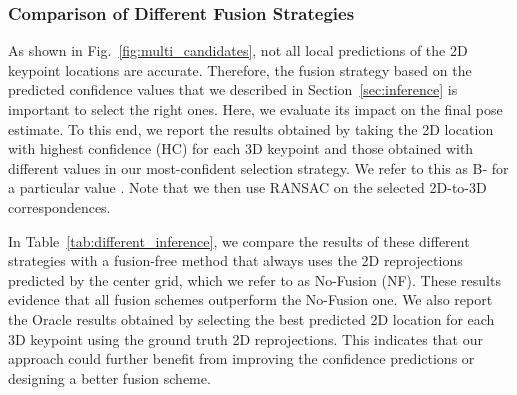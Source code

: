 \documentclass[10pt,twocolumn,letterpaper]{article}
\begin{document}
\subsubsection{Comparison of Different Fusion Strategies}
\label{sec:differentInference}

As shown in Fig.~\ref{fig:multi_candidates}, not all local predictions of the 2D keypoint locations are accurate. Therefore, the fusion strategy based on the predicted confidence values that we described in Section~\ref{sec:inference} is important to select the right ones. Here, we evaluate its impact on the final pose estimate. To this end, we report the results obtained by taking the 2D location with highest confidence (HC) for each 3D keypoint and those obtained with different values  in our  most-confident selection strategy. We refer to this as B- for a particular value . Note that we then use RANSAC on the selected 2D-to-3D correspondences.

In Table~\ref{tab:different_inference}, we compare the results of these different strategies with a fusion-free method that always uses the 2D reprojections predicted by the center grid, which we refer to as No-Fusion (NF). These results evidence that all fusion schemes outperform the No-Fusion one. We also report the Oracle results obtained by selecting the best predicted 2D location for each 3D keypoint using the ground truth 2D reprojections. This indicates that our approach could further benefit from improving the confidence predictions or designing a better fusion scheme. 
\end{document}
